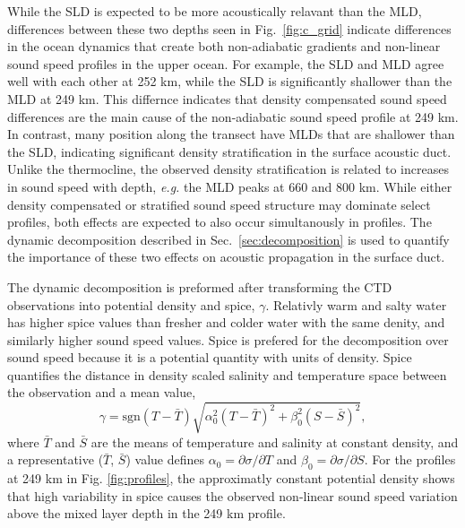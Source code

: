 \documentclass[preprint,NumberedRefs]{JASA}
\begin{document}
While the SLD is expected to be more acoustically relavant than the MLD, differences between these two depths seen in Fig.~\ref{fig:c_grid} indicate differences in the ocean dynamics that create both non-adiabatic gradients and non-linear sound speed profiles in the upper ocean. For example, the SLD and MLD agree well with each other at 252 km, while the SLD is significantly shallower than the MLD at 249 km. This differnce indicates that density compensated sound speed differences are the main cause of the non-adiabatic sound speed profile at 249 km. In contrast, many position along the transect have MLDs that are shallower than the SLD, indicating significant density stratification in the surface acoustic duct. Unlike the thermocline, the observed density stratification is related to increases in sound speed with depth, \emph{e.g.} the MLD peaks at 660 and 800 km. While either density compensated or stratified sound speed structure may dominate select profiles, both effects are expected to also occur simultanously in profiles. The dynamic decomposition described in Sec.~\ref{sec:decomposition} is used to quantify the importance of these two effects on acoustic propagation in the surface duct.

The dynamic decomposition is preformed after transforming the CTD observations into potential density and spice, $\gamma$. Relativly warm and salty water has higher spice values than fresher and colder water with the same denity, and similarly higher sound speed values. Spice is prefered for the decomposition over sound speed because it is a potential quantity with units of density. Spice quantifies the distance in density scaled salinity and temperature space between the observation and a mean value,
\begin{equation}
    \gamma=\textrm{sgn}(T-\bar{T}) \sqrt{\alpha_0^2(T-\bar{T})^2 +\beta_0^2(S-\bar{S})^2},
    \label{eq:gamma}
\end{equation}
where $\bar{T}$ and $\bar{S}$ are the means of temperature and salinity at constant density, and a representative ($\bar{T}$, $\bar{S}$) value defines $\alpha_0=\partial \sigma / \partial T$ and $\beta_0=\partial \sigma / \partial S$. For the profiles at 249 km in Fig. \ref{fig:profiles}, the approximatly constant potential density shows that high variability in spice causes the observed non-linear sound speed variation above the mixed layer depth  in the 249 km profile.
\end{document}
